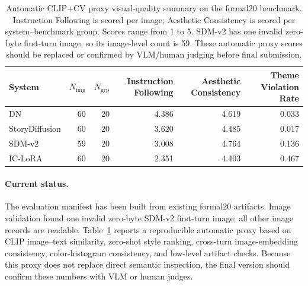 \begin{table}[t]
\centering
\small
\begin{tabular}{lrrrrr}
\toprule
System & $N_{\mathrm{img}}$ & $N_{\mathrm{grp}}$ & Instruction Following & Aesthetic Consistency & Theme Violation Rate \\
\midrule
DN & 60 & 20 & 4.386 & 4.619 & 0.033 \\
StoryDiffusion & 60 & 20 & 3.620 & 4.485 & 0.017 \\
SDM-v2 & 59 & 20 & 3.008 & 4.764 & 0.136 \\
IC-LoRA & 60 & 20 & 2.351 & 4.403 & 0.467 \\
\bottomrule
\end{tabular}
\caption{Automatic CLIP+CV proxy visual-quality summary on the formal20 benchmark. Instruction Following is scored per image; Aesthetic Consistency is scored per system--benchmark group. Scores range from 1 to 5. SDM-v2 has one invalid zero-byte first-turn image, so its image-level count is 59. These automatic proxy scores should be replaced or confirmed by VLM/human judging before final submission.}
\label{tab:visual-quality-main}
\end{table}

\paragraph{Current status.}
The evaluation manifest has been built from existing formal20 artifacts. Image validation found one invalid zero-byte SDM-v2 first-turn image; all other image records are readable. Table~\ref{tab:visual-quality-main} reports a reproducible automatic proxy based on CLIP image--text similarity, zero-shot style ranking, cross-turn image-embedding consistency, color-histogram consistency, and low-level artifact checks. Because this proxy does not replace direct semantic inspection, the final version should confirm these numbers with VLM or human judges.
